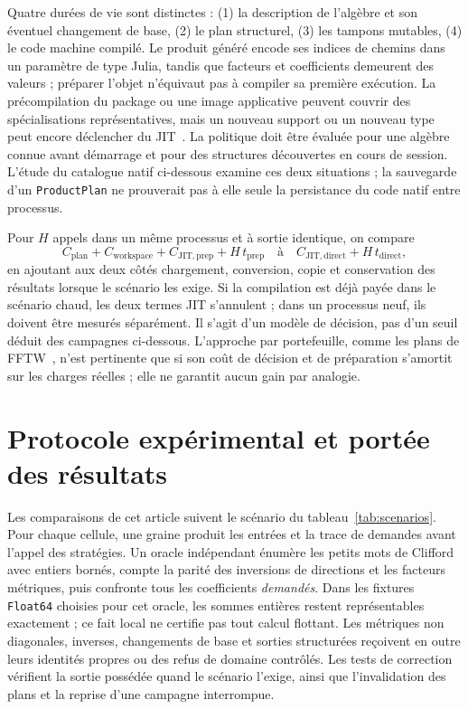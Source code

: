 \documentclass[11pt,a4paper]{article}
\newcommand{\code}[1]{\texttt{#1}}
\begin{document}
Quatre durées de vie sont distinctes : (1) la description de l'algèbre et son
éventuel changement de base, (2) le plan structurel, (3) les tampons mutables,
(4) le code machine compilé. Le produit généré encode ses indices de chemins
dans un paramètre de type Julia, tandis que facteurs et coefficients demeurent
des valeurs ; préparer l'objet n'équivaut pas à compiler sa première exécution.
La précompilation du package ou une image applicative peuvent couvrir des
spécialisations représentatives, mais un nouveau support ou un nouveau type
peut encore déclencher du JIT~\cite{juliaprecompile}. La politique doit être
évaluée pour une algèbre connue avant démarrage et pour des structures
découvertes en cours de session. L'étude du catalogue natif ci-dessous examine ces
deux situations ; la sauvegarde d'un \code{ProductPlan} ne prouverait pas à
elle seule la persistance du code natif entre processus.

Pour $H$ appels dans un même processus et à sortie identique, on compare
\begin{equation}
C_{\mathrm{plan}}+C_{\mathrm{workspace}}+C_{\mathrm{JIT,prep}}
  +H\,t_{\mathrm{prep}}
\quad\text{à}\quad C_{\mathrm{JIT,direct}}+H\,t_{\mathrm{direct}},
\label{eq:amort}
\end{equation}
en ajoutant aux deux côtés chargement, conversion, copie et conservation des
résultats lorsque le scénario les exige. Si la compilation est déjà payée dans
le scénario chaud, les deux termes JIT s'annulent ; dans un processus neuf,
ils doivent être mesurés séparément. Il s'agit d'un modèle de décision, pas
d'un seuil déduit des campagnes ci-dessous.
L'approche par portefeuille, comme les plans de FFTW~\cite{fftw}, n'est
pertinente que si son coût de décision et de préparation s'amortit sur les
charges réelles ; elle ne garantit aucun gain par analogie.

\section{Protocole expérimental et portée des résultats}
\label{sec:protocol}
Les comparaisons de cet article suivent le scénario du
tableau~\ref{tab:scenarios}. Pour chaque cellule, une graine produit les
entrées et la trace de demandes avant l'appel des stratégies. Un oracle
indépendant énumère les petits mots de Clifford avec entiers bornés,
compte la parité des inversions de directions et les facteurs métriques,
puis confronte tous les coefficients \emph{demandés}. Dans les fixtures
\code{Float64} choisies pour cet oracle, les sommes entières restent
représentables exactement ; ce fait local ne certifie pas tout calcul
flottant. Les métriques non diagonales, inverses, changements de base
et sorties structurées reçoivent en outre leurs identités propres ou
des refus de domaine contrôlés. Les tests de correction vérifient la
sortie possédée quand le scénario l'exige, ainsi que l'invalidation
des plans et la reprise d'une campagne interrompue.
\end{document}
